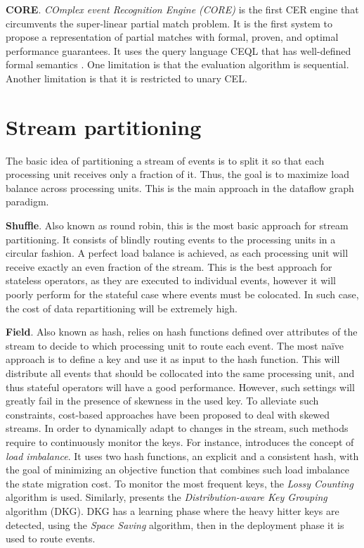 \textbf{CORE}. \emph{COmplex event Recognition Engine (CORE)} \cite{core} is the first CER engine that circumvents the super-linear partial match problem. It is the first system to propose a representation of partial matches with formal, proven, and optimal performance guarantees. It uses the query language CEQL that has well-defined formal semantics \cite{on-the-expressiveness}. One limitation is that the evaluation algorithm is sequential. Another limitation is that it is restricted to unary CEL.

\section{Stream partitioning}\label{sec:stream-partitioning}

The basic idea of partitioning a stream of events is to split it so that each processing unit receives only a fraction of it. Thus, the goal is to maximize load balance across processing units. This is the main approach in the dataflow graph paradigm.

\textbf{Shuffle}. Also known as round robin, this is the most basic approach for stream partitioning. It consists of blindly routing events to the processing units in a circular fashion. A perfect load balance is achieved, as each processing unit will receive exactly an even fraction of the stream. This is the best approach for stateless operators, as they are executed to individual events, however it will poorly perform for the stateful case where events must be colocated. In such case, the cost of data repartitioning will be extremely high.

\textbf{Field}. Also known as hash, relies on hash functions defined over attributes of the stream to decide to which processing unit to route each event. The most na\"ive approach is to define a key and use it as input to the hash function. This will distribute all events that should be collocated into the same processing unit, and thus stateful operators will have a good performance. However, such settings will greatly fail in the presence of skewness in the used key. To alleviate such constraints, cost-based approaches have been proposed to deal with skewed streams. In order to dynamically adapt to changes in the stream, such methods require to continuously monitor the keys. For instance, \cite{DBLP:journals/vldb/Gedik14} introduces the concept of \textit{load imbalance}. It uses two hash functions, an explicit and a consistent hash, with the goal of minimizing an objective function that combines such load imbalance the state migration cost. To monitor the most frequent keys, the \textit{Lossy Counting} algorithm is used. Similarly, \cite{DBLP:conf/debs/RivettiQABS15} presents the \textit{Distribution-aware Key Grouping} algorithm (DKG). DKG has a learning phase where the heavy hitter keys are detected, using the \textit{Space Saving} algorithm, then in the deployment phase it is used to route events.


